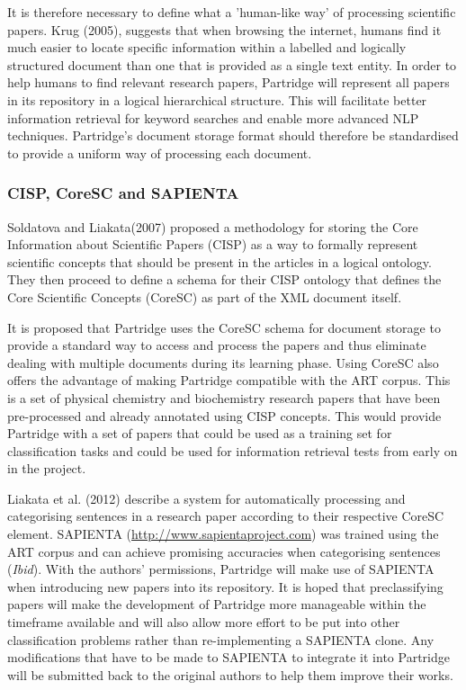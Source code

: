 \documentclass[12pt,a4paper]{article}
\begin{document}
It is therefore necessary to define what a 'human-like way' of processing
scientific papers.  Krug (2005), suggests that when browsing the internet,
humans find it much easier to locate specific information within a labelled and
logically structured document than one that is provided as a single text
entity\cite{Krug:2005:DMM:1051204}. In order to help humans to find relevant
research papers, Partridge will represent all papers in its repository in a
logical hierarchical structure. This will facilitate better information
retrieval for keyword searches and enable more advanced NLP techniques.
Partridge's document storage format should therefore be standardised to provide
a uniform way of processing each document. 

\subsubsection{CISP, CoreSC and SAPIENTA}

Soldatova and Liakata(2007) proposed a methodology for storing the Core
Information about Scientific Papers (CISP) as a way to formally represent
scientific concepts that should be present in the articles in a logical
ontology\cite{soldatova2007ontology}. They then proceed to define a schema for
their CISP ontology that defines the Core Scientific Concepts (CoreSC) as part
of the XML document itself\cite{liakata2008guidelines}. 

It is proposed that Partridge uses the CoreSC schema for document storage
to provide a standard way to access and process the papers and thus
eliminate dealing with multiple documents during its learning phase. 
Using CoreSC also offers the advantage of making Partridge compatible
with the ART corpus. This is a set of physical chemistry and biochemistry
research papers that have been pre-processed and already annotated using CISP
concepts\cite{liakataART}. This would provide Partridge with a set of papers
that could be used as a training set for classification tasks and could be used
for information retrieval tests from early on in the project.

Liakata et al. (2012) describe a system for automatically processing and
categorising sentences in a research paper according to their respective
CoreSC element\cite{citeulike:10444769}. SAPIENTA
(\url{http://www.sapientaproject.com}) was trained using the ART corpus and
can achieve promising accuracies when categorising sentences (\emph{Ibid}). With
the authors' permissions, Partridge will make use of SAPIENTA when introducing
new papers into its repository. It is hoped that preclassifying papers will
make the development of Partridge more manageable within the timeframe
available and will also allow more effort to be put into other classification
problems rather than re-implementing a SAPIENTA clone. Any modifications that
have to be made to SAPIENTA to integrate it into Partridge will be submitted
back to the original authors to help them improve their works.
\end{document}
